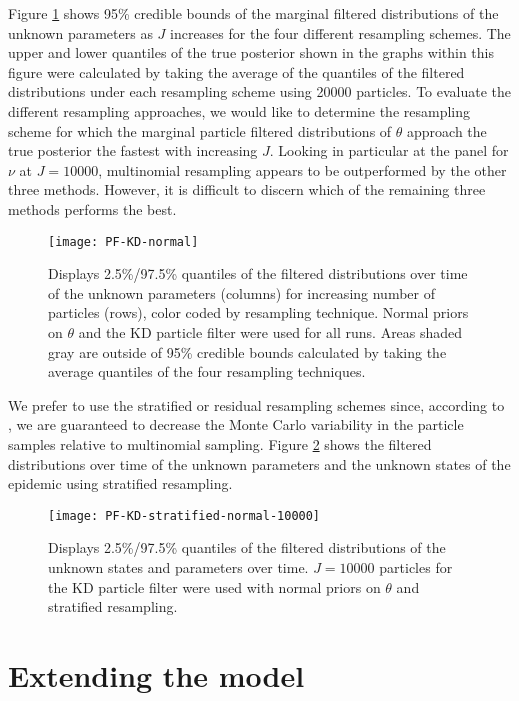 \documentclass{elsarticle}
\begin{document}
Figure \ref{fig:resamp} shows 95\% credible bounds of the marginal filtered distributions of the unknown parameters as $J$ increases for the four different resampling schemes.  The upper and lower quantiles of the true posterior shown in the graphs within this figure were calculated by taking the average of the quantiles of the filtered distributions under each resampling scheme using 20000 particles.  To evaluate the different resampling approaches, we would like to determine the resampling scheme for which the marginal particle filtered distributions of $\theta$ approach the true posterior the fastest with increasing $J$.  Looking in particular at the panel for $\nu$ at $J = 10000$, multinomial resampling appears to be outperformed by the other three methods.  However, it is difficult to discern which of the remaining three methods performs the best.

\begin{figure}
\centering
\texttt{[image: PF-KD-normal]}
\caption{Displays 2.5\%/97.5\% quantiles of the filtered distributions over time of the unknown parameters (columns) for increasing number of particles (rows), color coded by resampling technique.  Normal priors on $\theta$ and the KD particle filter were used for all runs.  Areas shaded gray are outside of 95\% credible bounds calculated by taking the average quantiles of the four resampling techniques.} \label{fig:resamp}
\end{figure}

We prefer to use the stratified or residual resampling schemes since, according to \cite{Douc:Capp:Moul:comp:2005}, we are guaranteed to decrease the Monte Carlo variability in the particle samples relative to multinomial sampling.  Figure \ref{fig:strat} shows the filtered distributions over time of the unknown parameters and the unknown states of the epidemic using stratified resampling.

\begin{figure}
\centering
\texttt{[image: PF-KD-stratified-normal-10000]}
\caption{Displays 2.5\%/97.5\% quantiles of the filtered distributions of the unknown states and parameters over time.  $J = 10000$ particles for the KD particle filter were used with normal priors on $\theta$ and stratified resampling.} \label{fig:strat}
\end{figure}

\section{Extending the model \label{sec:extend}}
\end{document}
